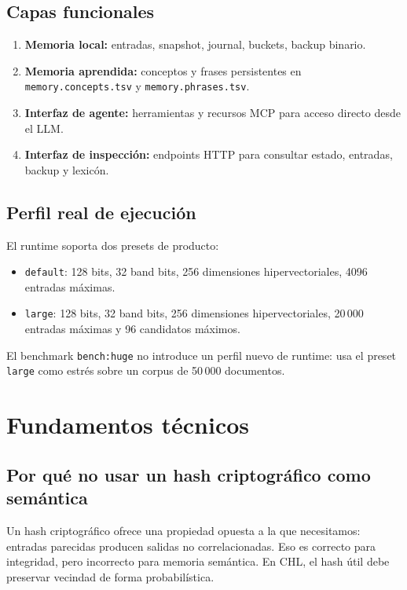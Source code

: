 \documentclass[11pt]{article}
\newcommand{\CHL}{\textsc{CHL}}
\newcommand{\MCP}{\textsc{MCP}}
\begin{document}
\subsection{Capas funcionales}

\begin{enumerate}
  \item \textbf{Memoria local:} entradas, snapshot, journal, buckets, backup binario.
  \item \textbf{Memoria aprendida:} conceptos y frases persistentes en \texttt{memory.concepts.tsv} y \texttt{memory.phrases.tsv}.
  \item \textbf{Interfaz de agente:} herramientas y recursos \MCP{} para acceso directo desde el LLM.
  \item \textbf{Interfaz de inspección:} endpoints HTTP para consultar estado, entradas, backup y lexicón.
\end{enumerate}

\subsection{Perfil real de ejecución}

El runtime soporta dos presets de producto:
\begin{itemize}
  \item \texttt{default}: 128 bits, 32 band bits, 256 dimensiones hipervectoriales, 4096 entradas máximas.
  \item \texttt{large}: 128 bits, 32 band bits, 256 dimensiones hipervectoriales, 20\,000 entradas máximas y 96 candidatos máximos.
\end{itemize}

El benchmark \texttt{bench:huge} no introduce un perfil nuevo de runtime: usa el preset \texttt{large} como estrés sobre un corpus de 50\,000 documentos.

\section{Fundamentos técnicos}

\subsection{Por qué no usar un hash criptográfico como semántica}

Un hash criptográfico ofrece una propiedad opuesta a la que necesitamos: entradas parecidas producen salidas no correlacionadas. Eso es correcto para integridad, pero incorrecto para memoria semántica. En \CHL{}, el hash útil debe preservar vecindad de forma probabilística.
\end{document}
